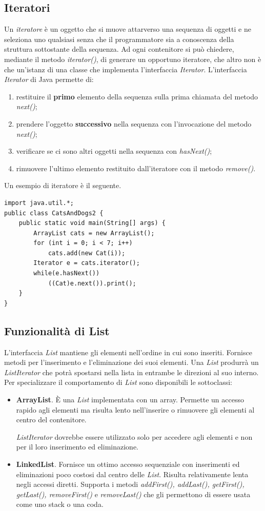 \documentclass[12pt]{report}
\begin{document}
\subsection{Iteratori} Un \textit{iteratore} è un oggetto che si muove attarverso una sequenza di oggetti e ne seleziona uno qualsiasi senza che il programmatore sia a conoscenza della struttura sottostante della sequenza. Ad ogni contenitore si può chiedere, mediante il metodo \textit{iterator()}, di generare un opportuno iteratore, che altro non è che un'istanz di una classe che implementa l'interfaccia \textit{Iterator}. L'interfaccia \textit{Iterator} di Java permette di:
\begin{enumerate}
	\item restituire il \textbf{primo} elemento della sequenza sulla prima chiamata del metodo \textit{next()};
	\item prendere l'oggetto \textbf{successivo} nella sequenza con l'invocazione del metodo \textit{next()};
	\item verificare se ci sono altri oggetti nella sequenza con \textit{hasNext()};
	\item rimuovere l'ultimo elemento restituito dall'iteratore con il metodo \textit{remove()}.
\end{enumerate}
Un esempio di iteratore è il seguente.
\begin{lstlisting}[style=javastyle]
import java.util.*;
public class CatsAndDogs2 {
	public static void main(String[] args) {
		ArrayList cats = new ArrayList();
		for (int i = 0; i < 7; i++)
			cats.add(new Cat(i));
		Iterator e = cats.iterator();
		while(e.hasNext())
			((Cat)e.next()).print();
	}
}
\end{lstlisting}
\subsection{Funzionalità di List}
L'interfaccia \textit{List} mantiene gli elementi nell'ordine in cui sono inseriti. Fornisce metodi per l'inserimento e l'eliminazione dei suoi elementi. Una \textit{List} produrrà un \textit{ListIterator} che potrà spostarsi nella lista in entrambe le direzioni al suo interno. Per specializzare il comportamento di \textit{List} sono disponibili le sottoclassi:
\begin{itemize}
	\item \textbf{ArrayList}. È una \textit{List} implementata con un array. Permette un accesso rapido agli elementi ma risulta lento nell'inserire o rimuovere gli elementi al centro del contenitore.

	\textit{ListIterator} dovrebbe essere utilizzato solo per accedere agli elementi e non per il loro inserimento ed eliminazione.
	\item \textbf{LinkedList}. Fornisce un ottimo accesso sequenziale con inserimenti ed eliminazioni poco costosi dal centro delle \textit{List}. Risulta relativamente lenta negli accessi diretti. Supporta i metodi \textit{addFirst(), addLast(), getFirst(), getLast(), removeFirst()} e \textit{removeLast()} che gli permettono di essere usata come uno stack o una coda.
\end{itemize}
\end{document}
